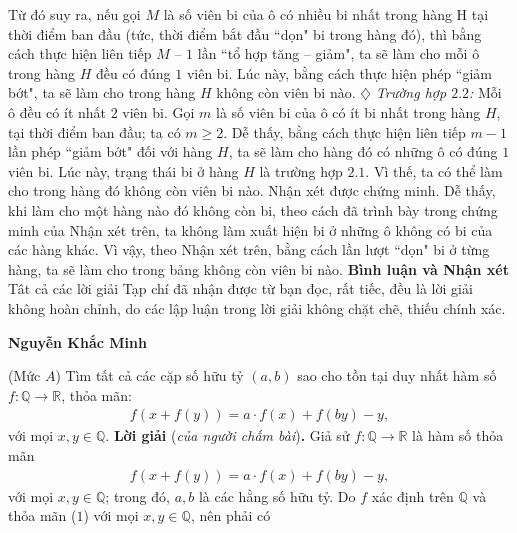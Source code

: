\begin{multicols}{2}
	\vskip 0.05cm
	Từ đó suy ra, nếu gọi $M$ là số viên bi của ô có nhiều bi nhất trong hàng H tại thời điểm ban đầu (tức, thời điểm bắt đầu ``dọn" bi trong hàng đó), thì bằng cách thực hiện liên tiếp $M$ -- $1$ lần ``tổ hợp tăng -- giảm", ta sẽ làm cho mỗi ô trong hàng $H$ đều có đúng $1$ viên bi. Lúc này, bằng cách thực hiện phép ``giảm bớt", ta sẽ làm cho trong hàng $H$ không còn viên bi nào.
	\vskip 0.05cm
	$\diamondsuit$ \textit{Trường hợp $2.2$:} Mỗi ô đều có ít nhất $2$ viên bi.
	\vskip 0.05cm
	Gọi $m$ là số viên bi của ô có ít bi nhất trong hàng $H$, tại thời điểm ban đầu; ta có $m \ge 2$.
	\vskip 0.05cm
	Dễ thấy, bằng cách thực hiện liên tiếp $m - 1$ lần phép ``giảm bớt" đối với hàng $H$, ta sẽ làm cho hàng đó có những ô có đúng $1$ viên bi. Lúc này, trạng thái bi ở hàng $H$ là trường hợp $2.1$. Vì thế, ta có thể làm cho trong hàng đó không còn viên bi nào.
	\vskip 0.05cm
	Nhận xét được chứng minh.
	\vskip 0.05cm
	Dễ thấy, khi làm cho một hàng nào đó không còn bi, theo cách đã trình bày trong chứng minh của Nhận xét trên, ta không làm xuất hiện bi ở những ô không có bi của các hàng khác. Vì vậy, theo Nhận xét trên, bằng cách lần lượt ``dọn" bi ở từng hàng, ta sẽ làm cho trong bảng không còn viên bi nào.
	\vskip 0.05cm
	\textbf{\color{thachthuctoanhoc}Bình luận và Nhận xét}
	\vskip 0.05cm
	Tât cả các lời giải Tạp chí đã nhận được từ bạn đọc, rất tiếc, đều là lời giải không hoàn chỉnh, do các lập luận trong lời giải không chặt chẽ, thiếu chính xác.
	\begin{flushright}
		\textbf{\color{thachthuctoanhoc}Nguyễn Khắc Minh}
	\end{flushright}
	{}
	(Mức $A$) Tìm tất cả các cặp số hữu tỷ $(a, b)$ sao cho tồn tại duy nhất hàm số $f: \mathbb{Q} \to \mathbb{R}$, thỏa mãn:
	\begin{align*}
		f\left( {x + f\left( y \right)} \right) = a \cdot f\left( x \right) + f\left( {by} \right) - y,
	\end{align*}
	với mọi $x, y \in \mathbb{Q}$.
	\vskip 0.05cm
	\textbf{\color{thachthuctoanhoc}Lời giải} (\textit{của người chấm bài})\textbf{\color{thachthuctoanhoc}.}
	\vskip 0.05cm
	Giả sử $f: \mathbb{Q} \to \mathbb{R}$  là hàm số thỏa mãn
	\begin{align*}
		f\left( {x + f\left( y \right)} \right) = a \cdot f\left( x \right) + f\left( {by} \right) - y, \tag{$1$}
	\end{align*}
	với mọi $x,y \in \mathbb{Q}$; trong đó, $a, b$ là các hằng số hữu tỷ.
	\vskip 0.05cm
	Do $f$  xác định trên  $\mathbb{Q}$ và thỏa mãn ($1$) với mọi  $x,y \in \mathbb{Q}$, nên phải có

\end{multicols}
